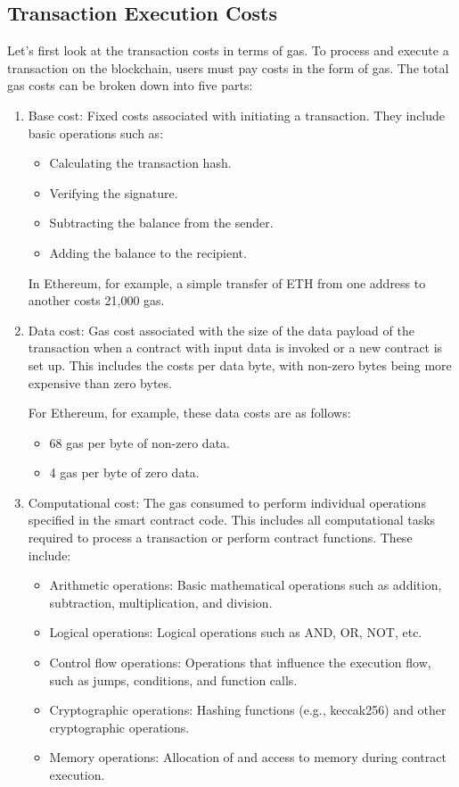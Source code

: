 \documentclass[runningheads]{llncs}
\begin{document}
\subsection{Transaction Execution Costs}
Let's first look at the transaction costs in terms of gas. To process and execute a transaction on the blockchain, users must pay costs in the form of gas. The total gas costs can be broken down into five parts:

\begin{enumerate}
\item Base cost: Fixed costs associated with initiating a transaction. They include basic operations such as:
\begin{itemize}
\item Calculating the transaction hash.
\item Verifying the signature.
\item Subtracting the balance from the sender.
\item Adding the balance to the recipient.
\end{itemize}
In Ethereum, for example, a simple transfer of ETH from one address to another costs 21,000 gas.
\item Data cost: Gas cost associated with the size of the data payload of the transaction when a contract with input data is invoked or a new contract is set up. This includes the costs per data byte, with non-zero bytes being more expensive than zero bytes.

 For Ethereum, for example, these data costs are as follows:
\begin{itemize}
    \item 68 gas per byte of non-zero data.
    \item 4 gas per byte of zero data.
\end{itemize}

\item Computational cost: The gas consumed to perform individual operations specified in the smart contract code. This includes all computational tasks required to process a transaction or perform contract functions. These include:
\begin{itemize}
    \item Arithmetic operations: Basic mathematical operations such as addition, subtraction, multiplication, and division.
    \item Logical operations: Logical operations such as AND, OR, NOT, etc.
    \item Control flow operations: Operations that influence the execution flow, such as jumps, conditions, and function calls.
    \item Cryptographic operations: Hashing functions (e.g., keccak256) and other cryptographic operations.
    \item Memory operations: Allocation of and access to memory during contract execution.
\end{itemize}


\end{enumerate}
\end{document}
